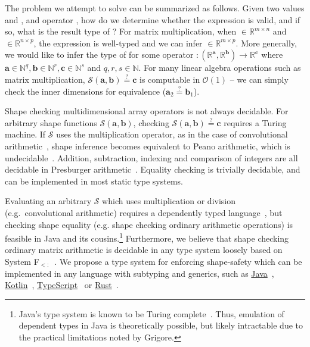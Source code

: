The problem we attempt to solve can be summarized as follows. Given two values  and , and operator \inline{\$}, how do we determine whether the expression  is valid, and if so, what is the result type of ? For matrix multiplication, when  $\in \mathbb{R}^{m \times n}$ and  $\in \mathbb{R}^{n \times p}$, the expression is well-typed and we can infer  $\in \mathbb{R}^{m \times p}$. More generally, we would like to infer the type of  for some operator  $: (\mathbb{R}^\mathbf{a}, \mathbb{R}^\mathbf{b}) \rightarrow \mathbb{R}^\mathbf{c}$ where $\mathbf{a} \in \mathbb{N}^q, \mathbf{b} \in \mathbb{N}^r, \mathbf{c} \in \mathbb{N}^s$ and $q, r, s \in \mathbb{N}$. For many linear algebra operations such as matrix multiplication, $\mathcal{S}(\mathbf a, \mathbf b) \stackrel{?}{=} \mathbf c$ is computable in $\mathcal{O}(1)$ -- we can simply check the inner dimensions for equivalence ($\mathbf{a}_2 \stackrel{?}{=} \mathbf{b}_1$).

Shape checking multidimensional array operators is not always decidable. For arbitrary shape functions $\mathcal{S}(\mathbf{a}, \mathbf{b})$, checking $\mathcal{S}(\mathbf{a}, \mathbf{b}) \stackrel{?}{=} \mathbf{c}$ requires a Turing machine. If $\mathcal{S}$ uses the multiplication operator, as in the case of convolutional arithmetic~\citep{dumoulin2016guide}, shape inference becomes equivalent to Peano arithmetic, which is undecidable~\citep{godel1931formal}. Addition, subtraction, indexing and comparison of integers are all decidable in Presburger arithmetic~\citep{suzuki1980verification, bradley2006decidable, charlier2011enumeration}. Equality checking is trivially decidable, and can be implemented in most static type systems.

Evaluating an arbitrary $\mathcal{S}$ which uses multiplication or division (e.g.\ convolutional arithmetic) requires a dependently typed language~\citep{xi1998eliminating, pineyro2019structure}, but checking shape equality (e.g. shape checking ordinary arithmetic operations) is feasible in Java and its cousins.\hspace{-.08em}\footnote{Java's type system is known to be Turing complete~\citep{grigore2017java}. Thus, emulation of dependent types in Java is theoretically possible, but likely intractable due to the practical limitations noted by Grigore.} Furthermore, we believe that shape checking ordinary matrix arithmetic is decidable in any type system loosely based on System F${}_{<:}$~\citep{cardelli1991extension}. We propose a type system for enforcing shape-safety which can be implemented in any language with subtyping and generics, such as \href{https://docs.oracle.com/javase/tutorial/java/generics/index.html}{Java}~\citep{naftalin2007java}, \href{https://kotlinlang.org/docs/reference/generics.html}{Kotlin}~\citep{tate2013mixed}, \href{https://www.typescriptlang.org/docs/handbook/advanced-types.html}{TypeScript}~\citep{bierman2014understanding} or \href{https://doc.rust-lang.org/1.7.0/book/generics.html}{Rust}~\citep{crozet2019nalgebra}.

